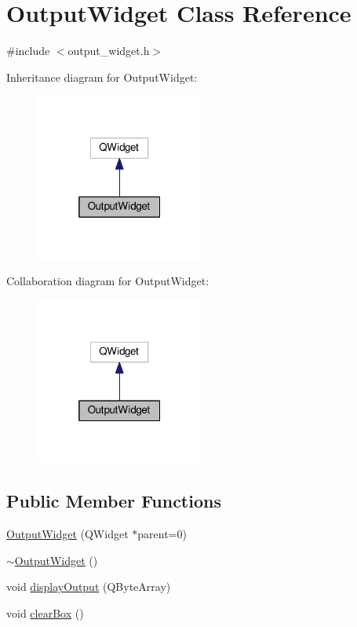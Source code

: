 \hypertarget{classOutputWidget}{}\section{Output\+Widget Class Reference}
\label{classOutputWidget}


{\ttfamily \#include $<$output\+\_\+widget.\+h$>$}



Inheritance diagram for Output\+Widget\+:
\nopagebreak
\begin{figure}[H]
\begin{center}
\leavevmode
\includegraphics[width=157pt]{classOutputWidget__inherit__graph}
\end{center}
\end{figure}


Collaboration diagram for Output\+Widget\+:
\nopagebreak
\begin{figure}[H]
\begin{center}
\leavevmode
\includegraphics[width=157pt]{classOutputWidget__coll__graph}
\end{center}
\end{figure}
\subsection*{Public Member Functions}
\begin{DoxyCompactItemize}
\item 
\hyperlink{classOutputWidget_a61df9bcea97f4c62b2d564d20bdbae91}{Output\+Widget} (Q\+Widget $\ast$parent=0)
\item 
\hyperlink{classOutputWidget_a7f00baf23905815aa3a846f0df8555bc}{$\sim$\+Output\+Widget} ()
\item 
void \hyperlink{classOutputWidget_a7dbe34186990f08c4ef33b026f4f65b3}{display\+Output} (Q\+Byte\+Array)
\item 
void \hyperlink{classOutputWidget_a75340d5f04a62332cfd52802090b52c4}{clear\+Box} ()
\end{DoxyCompactItemize}
